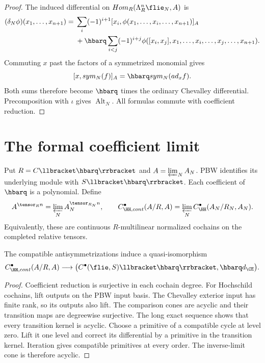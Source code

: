 \begin{proof}
The induced differential on
$\operatorname{Hom}_R(\Lambda_R^n\flie_N,A)$ is
\[
\begin{split}
 (\delta_N\phi)(x_1,\ldots,x_{n+1})
 ={}&\sum_i(-1)^{i+1}
 [x_i,\phi(x_1,\ldots,\widehat{x_i},\ldots,x_{n+1})]_A\\
 &+\hbarq\sum_{i<j}(-1)^{i+j}
 \phi([x_i,x_j],x_1,\ldots,\widehat{x_i},
                         \ldots,\widehat{x_j},\ldots,x_{n+1}).
\end{split}
\]
Commuting $x$ past the factors of a symmetrized monomial gives
\[
 [x,\operatorname{sym}_N(f)]_A
 =\hbarq\operatorname{sym}_N(\operatorname{ad}_x f).
\]
Both sums therefore become $\hbarq$ times the ordinary Chevalley differential.
Precomposition with $\iota$ gives $\operatorname{Alt}_N$.
All formulas commute with coefficient reduction.
\end{proof}

\section{The formal coefficient limit}
Put $R=\C\llbracket\hbarq\rrbracket$ and $A=\varprojlim_N A_N$.
PBW identifies its underlying module with $S\llbracket\hbarq\rrbracket$.
Each coefficient of $\hbarq$ is a polynomial.
Define
\[
 A^{\widehat\tensor_R n}=\varprojlim_N A_N^{\tensor_{R_N}n},
 \qquad
 C^\bullet_{\HH,\mathrm{cont}}(A/R,A)
 =\varprojlim_N C^\bullet_{\HH}(A_N/R_N,A_N).
\]
Equivalently, these are continuous $R$-multilinear normalized cochains
on the completed relative tensors.

\begin{corollary}\label{cor:vol2-formal-relative-rees}
The compatible antisymmetrizations induce a quasi-isomorphism
\[
 C^\bullet_{\HH,\mathrm{cont}}(A/R,A)
 \longrightarrow
 \bigl(C^\bullet(\flie,S)\llbracket\hbarq\rrbracket,
                    \hbarq d_{\CE}\bigr).
\]
\end{corollary}
\begin{proof}
Coefficient reduction is surjective in each cochain degree.
For Hochschild cochains, lift outputs on the PBW input basis.
The Chevalley exterior input has finite rank, so its outputs also lift.
The comparison cones are acyclic and their transition maps are degreewise surjective.
The long exact sequence shows that every transition kernel is acyclic.
Choose a primitive of a compatible cycle at level zero.
Lift it one level and correct its differential by a primitive in the transition kernel.
Iteration gives compatible primitives at every order.
The inverse-limit cone is therefore acyclic.
\end{proof}

